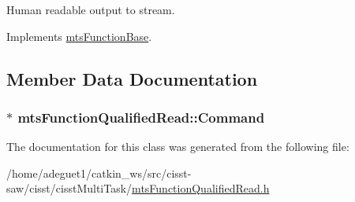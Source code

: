 Human readable output to stream. 

Implements \hyperlink{classmts_function_base_ae6e5497be34d5563f2df3cb24d68e959}{mts\-Function\-Base}.



\subsection{Member Data Documentation}
\hypertarget{classmts_function_qualified_read_a7ac0f02300ec56afa037eefb3cb55cef}{
\subsubsection[{Command}]{$\ast$ mts\-Function\-Qualified\-Read\-::\-Command\hspace{0.3cm}{\ttfamily [protected]}}}\label{classmts_function_qualified_read_a7ac0f02300ec56afa037eefb3cb55cef}


The documentation for this class was generated from the following file\-:\begin{DoxyCompactItemize}
\item 
/home/adeguet1/catkin\-\_\-ws/src/cisst-\/saw/cisst/cisst\-Multi\-Task/\hyperlink{mts_function_qualified_read_8h}{mts\-Function\-Qualified\-Read.\-h}\end{DoxyCompactItemize}
